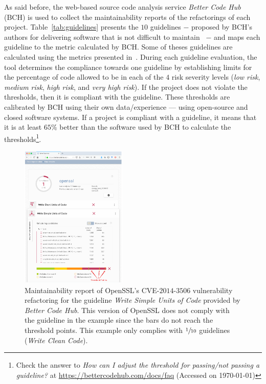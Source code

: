 \documentclass[sigconf,review]{acmart}
\begin{document}
As said before, the web-based source code analysis service \emph{Better Code
Hub} (BCH) is used to collect the maintainability reports of the refactorings of
each project. Table~\ref{tab:guidelines} presents the $10$ guidelines $-$ proposed
by BCH's authors for delivering software that is not difficult to
maintain~\cite{Visser:2016:OREILLY} $-$ and maps each guideline to the metric 
calculated by BCH. Some of theses guidelines are calculated using the metrics 
presented in~\cite{criteria:2017}. During each guideline evaluation, the tool
determines the compliance towards one guideline by establishing limits for the
percentage of code allowed to be in each of the $4$ risk severity levels
(\emph{low risk}, \emph{medium risk}, \emph{high risk}, and \emph{very high
risk}). If the project does not violate the thresholds, then it is compliant
with the guideline. These thresholds are calibrated by BCH using their own
data/experience --- using open-source and closed software systems. If a project is
compliant with a guideline, it means that it is at least $65\%$ better than the
software used by BCH to calculate the thresholds\footnote{Check the answer to
\emph{How can I adjust the threshold for passing/not passing a guideline?} at
\url{https://bettercodehub.com/docs/faq} (Accessed on \today{})}.

\begin{figure}[h]
 	\centering 	\includegraphics[width=0.45\textwidth]{figures/bch_report.png}
 	\caption{Maintainability report of OpenSSL's CVE-$2014$-$3506$ vulnerability
refactoring for the guideline \emph{Write Simple Units of Code} provided by
\emph{Better Code Hub}. This version of OpenSSL does not comply with the
guideline in the example since the bars do not reach the threshold points. This
example only complies with $\sfrac{1}{10}$ guidelines (\emph{Write Clean Code}).}
	\label{fig:bchrep}
\end{figure}
\end{document}
